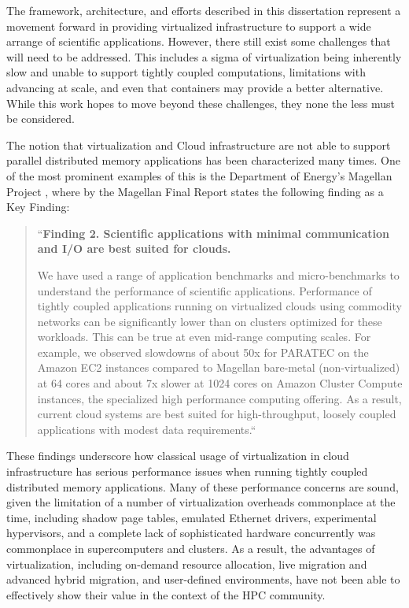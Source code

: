 The framework, architecture, and efforts described in this dissertation represent a movement forward in providing virtualized infrastructure to support a wide arrange of scientific applications. However, there still exist some challenges that will need to be addressed.  This includes a sigma of virtualization being inherently slow and unable to support tightly coupled computations, limitations with advancing at scale, and even that containers may provide a better alternative.  While this work hopes to move beyond these challenges, they none the less must be considered. 

The notion that virtualization and Cloud infrastructure are not able to support parallel distributed memory applications has been characterized many times. One of the most prominent examples of this is the Department of Energy's Magellan Project \cite{www-magellan}, where by the Magellan Final Report \cite{MagellanFinal} states the following finding as a Key Finding:
  
\begin{quote}
``\textbf{Finding 2. Scientific applications with minimal communication and I/O are best suited for
clouds.}

We have used a range of application benchmarks and micro-benchmarks to understand the performance of scientific applications. Performance of tightly coupled applications running on virtualized clouds using commodity networks can be significantly lower than on clusters optimized for these workloads. This can be true at even mid-range computing scales. For example, we observed slowdowns of about 50x for PARATEC on the Amazon EC2 instances compared to Magellan bare-metal (non-virtualized) at 64 cores and about 7x slower at 1024 cores on Amazon Cluster Compute instances, the specialized high performance computing offering. As a result, current cloud systems are best suited for high-throughput, loosely coupled applications with modest data requirements.``
\end{quote}

These findings underscore how classical usage of virtualization in cloud infrastructure has serious performance issues when running tightly coupled distributed memory applications. Many of these performance concerns are sound, given the limitation of a number of virtualization overheads commonplace at the time, including shadow page tables, emulated Ethernet drivers, experimental hypervisors, and a complete lack of sophisticated hardware concurrently was commonplace in supercomputers and clusters.  As a result, the advantages of virtualization, including on-demand resource allocation, live migration and advanced hybrid migration, and user-defined environments, have not been able to effectively show their value in the context of the HPC community.

